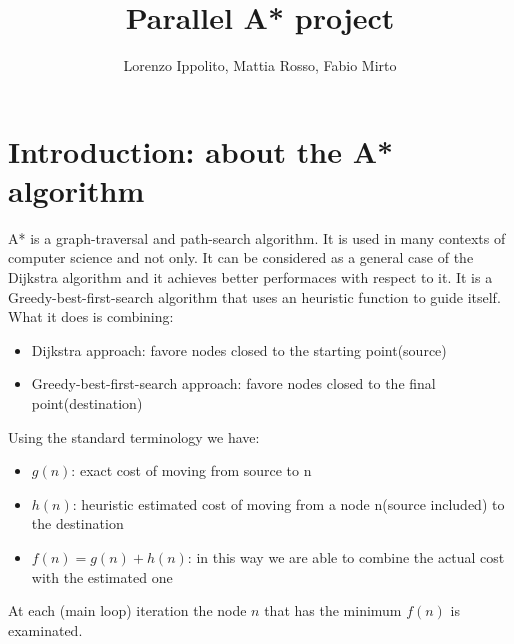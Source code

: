 \documentclass[twocolumn, switch]{article} %
\title{Parallel A* project}
\author{Lorenzo Ippolito, Mattia Rosso, Fabio Mirto}
\begin{document}




\section{Introduction: about the A* algorithm}
A* is a graph-traversal and path-search algorithm. It is used in many contexts of computer science and 
not only. It can be considered as a general case of the Dijkstra algorithm and it achieves better performaces
with respect to it. It is a Greedy-best-first-search algorithm that uses an heuristic function to guide
itself. What it does is combining:
\begin{itemize}
  \item Dijkstra approach: favore nodes closed to the starting point(source)
  \item Greedy-best-first-search approach: favore nodes closed to the final point(destination)
\end{itemize}
Using the standard terminology we have:
\begin{itemize}
  \item $g(n)$: exact cost of moving from source to n
  \item $h(n)$: heuristic estimated cost of moving from a node n(source included) to the destination
  \item $f(n) = g(n) + h(n)$: in this way we are able to combine the actual cost with the estimated one
\end{itemize}
At each (main loop) iteration the node $n$ that has the minimum $f(n)$ is examinated.
\end{document}
